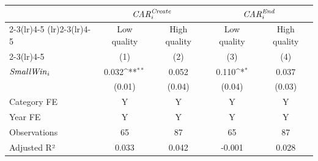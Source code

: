 {
\def\sym#1{\ifmmode^{#1}\else\(^{#1}\)\fi}
\begin{tabular}{l*{4}{c}}
\toprule
                    &\multicolumn{2}{c}{${\it CAR}^{\it Create}_{i}$}&\multicolumn{2}{c}{${\it CAR}^{\it End}_{i}$}\\\cmidrule(lr){2-3}\cmidrule(lr){4-5}
\cmidrule(lr){2-3}\cmidrule(lr){4-5} & \multicolumn{1}{c}{Low quality} & \multicolumn{1}{c}{High quality} & \multicolumn{1}{c}{Low quality} & \multicolumn{1}{c}{High quality} \\ \cmidrule(lr){2-3}\cmidrule(lr){4-5} & \multicolumn{1}{c}{(1)} & \multicolumn{1}{c}{(2)} & \multicolumn{1}{c}{(3)} & \multicolumn{1}{c}{(4)} \\ \midrule
${\it Small Win}_{i}$&       0.032\sym{**} &       0.052         &       0.110\sym{*}  &       0.037         \\
                    &      (0.01)         &      (0.04)         &      (0.04)         &      (0.03)         \\
\midrule
Category FE         &           Y         &           Y         &           Y         &           Y         \\
Year FE             &           Y         &           Y         &           Y         &           Y         \\
Observations        &          65         &          87         &          65         &          87         \\
Adjusted R²         &       0.033         &       0.042         &      -0.001         &       0.028         \\
\bottomrule
\end{tabular}
}
